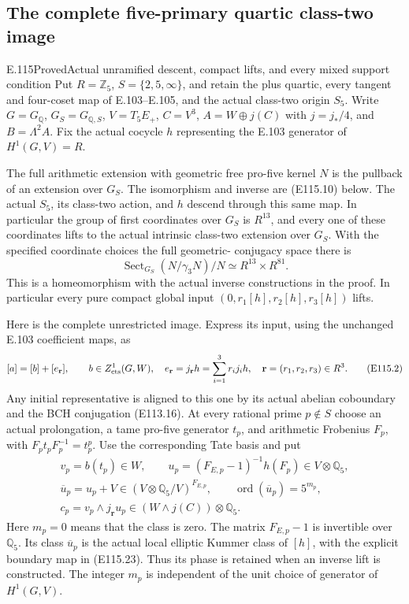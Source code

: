 \subsection*{The complete five-primary quartic class-two image}
\begin{statement}{E.115}{Proved}{Actual unramified descent, compact lifts, and every mixed support condition}
Put $R=\mathbb Z_5$, $S=\{2,5,\infty\}$, and retain the
plus quartic, every tangent and four-coset map of E.103--E.105,
and the actual class-two origin $S_5$.
Write $G=G_{\mathbb Q}$, $G_S=G_{\mathbb Q,S}$,
$V=T_5E_+$, $C=V^3$, $A=W\oplus j(C)$ with $j=j_*/4$,
and $B=\Lambda^2 A$.  Fix the actual cocycle $h$ representing
the E.103 generator of $H^1(G,V)=R$.

The full arithmetic extension with geometric free pro-five
kernel $N$ is the pullback of an extension over $G_S$.
The isomorphism and inverse are (E115.10) below.
The actual $S_5$, its class-two action, and $h$ descend through
this same map.  In particular the group of first coordinates
over $G_S$ is $R^{13}$, and every one of these coordinates
lifts to the actual intrinsic class-two extension over $G_S$.
With the specified coordinate choices the full geometric-
conjugacy space there is
\[
 \operatorname{Sect}_{G_S}(N/\gamma_3N)/N
       \simeq R^{13}\times R^{81}.
 \tag{E115.1}
\]
This is a homeomorphism with the actual inverse constructions
in the proof.  In particular every pure compact global input
$(0,r_1[h],r_2[h],r_3[h])$ lifts.

Here is the complete unrestricted image.  Express its input,
using the unchanged E.103 coefficient maps, as
\[
 [a]=[b]+[e_{\mathbf r}],\qquad
 b\in Z^1_{\rm cts}(G,W),\quad
 e_{\mathbf r}=j_{\mathbf r}h=\sum_{i=1}^3r_i j_i h,
 \quad\mathbf r=(r_1,r_2,r_3)\in R^3.
 \tag{E115.2}
\]
Any initial representative is aligned to this one by its actual
abelian coboundary and the BCH conjugation (E113.16).
At every rational prime $p\notin S$ choose an actual prolongation,
a tame pro-five generator $t_p$, and arithmetic Frobenius $F_p$,
with $F_pt_pF_p^{-1}=t_p^p$.
Use the corresponding Tate basis and put
\[
 \begin{gathered}
 v_p=b(t_p)\in W,\qquad
 u_p=(F_{E,p}-1)^{-1}h(F_p)\in V\otimes\mathbb Q_5,\\
 \overline u_p=u_p+V\in(V\otimes\mathbb Q_5/V)^{F_{E,p}},
 \qquad \operatorname{ord}(\overline u_p)=5^{m_p},\\
 c_p=v_p\wedge j_{\mathbf r}u_p\in
              (W\wedge j(C))\otimes\mathbb Q_5 .
 \end{gathered}
 \tag{E115.3}
\]
Here $m_p=0$ means that the class is zero.
The matrix $F_{E,p}-1$ is invertible over $\mathbb Q_5$.
Its class $\overline u_p$ is the actual local elliptic
Kummer class of $[h]$, with the explicit boundary map in
(E115.23).  Thus its phase is retained when an inverse lift
is constructed.  The integer $m_p$ is independent of the unit
choice of generator of $H^1(G,V)$.


\end{statement}
